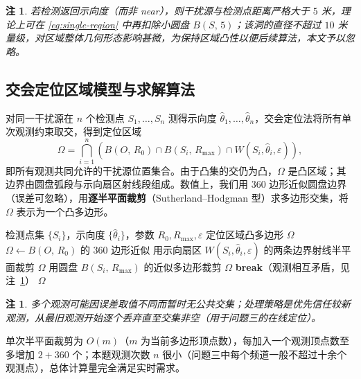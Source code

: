 \documentclass[12pt,a4paper]{ctexart}
\newtheorem{remark}[theorem]{注}
\numberwithin{figure}{section}
\numberwithin{table}{section}
\numberwithin{equation}{section}
\newcommand{\disk}[2]{B\!\left(#1,\,#2\right)}
\begin{document}
\begin{remark}
若检测返回示向度（而非 near），则干扰源与检测点距离严格大于 $5$ 米，理论上可在 \eqref{eq:single-region} 中再扣除小圆盘 $\disk{S}{5}$；该洞的直径不超过 $10$ 米量级，对区域整体几何形态影响甚微，为保持区域凸性以便后续算法，本文予以忽略。
\end{remark}

\subsection{交会定位区域模型与求解算法}

对同一干扰源在 $n$ 个检测点 $S_1,\dots,S_n$ 测得示向度 $\hat{\theta}_1,\dots,\hat{\theta}_n$，交会定位法将所有单次观测约束取交，得到定位区域
\begin{equation}
\Omega=\bigcap_{i=1}^{n}\left(\disk{O}{R_0}\cap\disk{S_i}{R_{\max}}\cap W(S_i,\hat{\theta}_i,\varepsilon)\right),
\label{eq:localize}
\end{equation}
即所有观测共同允许的干扰源位置集合。由于凸集的交仍为凸，$\Omega$ 是凸区域；其边界由圆盘弧段与示向扇区射线段组成。数值上，我们用 $360$ 边形近似圆盘边界（误差可忽略），用\textbf{逐半平面裁剪}（Sutherland--Hodgman 型）求多边形交集，将 $\Omega$ 表示为一个凸多边形。

\begin{algorithm}[H]
\caption{交会定位区域的求解（凸多边形裁剪）}
\label{alg:localize}
\begin{algorithmic}[1]
\Require 检测点集 $\{S_i\}$，示向度 $\{\hat{\theta}_i\}$，参数 $R_0,R_{\max},\varepsilon$
\Ensure 定位区域凸多边形 $\Omega$
\State $\Omega\leftarrow\disk{O}{R_0}$ 的 $360$ 边形近似
    \State 用示向扇区 $W(S_i,\hat{\theta}_i,\varepsilon)$ 的两条边界射线半平面裁剪 $\Omega$
    \State 用圆盘 $\disk{S_i}{R_{\max}}$ 的近似多边形裁剪 $\Omega$
    \If{$\Omega=\varnothing$} \State \textbf{break}（观测相互矛盾，见注~\ref{rem:contradict}） \EndIf
\EndFor
\State \Return $\Omega$
\end{algorithmic}
\end{algorithm}

\begin{remark}
\label{rem:contradict}
多个观测可能因误差取值不同而暂时无公共交集；处理策略是优先信任较新观测，从最旧观测开始逐个丢弃直至交集非空（用于问题三的在线定位）。
\end{remark}

单次半平面裁剪为 $O(m)$（$m$ 为当前多边形顶点数），每加入一个观测顶点数至多增加 $2+360$ 个；本题观测次数 $n$ 很小（问题三中每个频道一般不超过十余个观测点），总体计算量完全满足实时需求。
\end{document}

